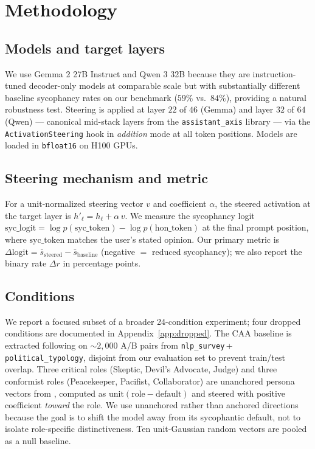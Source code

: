 \documentclass{article}
\theoremstyle{plain}
\theoremstyle{definition}
\theoremstyle{remark}
\begin{document}
\section{Methodology}\label{sec:method}

\subsection{Models and target layers}
We use Gemma 2 27B Instruct \cite{gemma2024} and Qwen 3 32B \cite{qwen2025} because they are instruction-tuned decoder-only models at comparable scale but with substantially different baseline sycophancy rates on our benchmark ($59\%$ vs.~$84\%$), providing a natural robustness test. Steering is applied at layer $22$ of $46$ (Gemma) and layer $32$ of $64$ (Qwen) --- canonical mid-stack layers from the \texttt{assistant\_axis} library \cite{lu2026} --- via the \texttt{ActivationSteering} hook in \emph{addition} mode at all token positions. Models are loaded in \texttt{bfloat16} on H100 GPUs.

\subsection{Steering mechanism and metric}
For a unit-normalized steering vector $v$ and coefficient $\alpha$, the steered activation at the target layer is $h'_\ell = h_\ell + \alpha\, v$. We measure the sycophancy logit $\mathrm{syc\_logit} = \log p(\mathrm{syc\_token}) - \log p(\mathrm{hon\_token})$ at the final prompt position, where $\mathrm{syc\_token}$ matches the user's stated opinion. Our primary metric is $\Delta\mathrm{logit} = \bar{s}_\mathrm{steered} - \bar{s}_\mathrm{baseline}$ (negative $=$ reduced sycophancy); we also report the binary rate $\Delta r$ in percentage points.

\subsection{Conditions}
We report a focused subset of a broader 24-condition experiment; four dropped conditions are documented in Appendix~\ref{app:dropped}. The CAA baseline is extracted following \citet{rimsky2024} on $\sim\!2{,}000$ A/B pairs from \texttt{nlp\_survey}\,+\,\texttt{political\_typology}, disjoint from our evaluation set to prevent train/test overlap. Three critical roles (Skeptic, Devil's Advocate, Judge) and three conformist roles (Peacekeeper, Pacifist, Collaborator) are unanchored persona vectors from \citet{lu2026}, computed as $\mathrm{unit}(\mathrm{role}-\mathrm{default})$ and steered with positive coefficient \emph{toward} the role. We use unanchored rather than anchored directions because the goal is to shift the model away from its sycophantic default, not to isolate role-specific distinctiveness. Ten unit-Gaussian random vectors are pooled as a null baseline.
\end{document}
